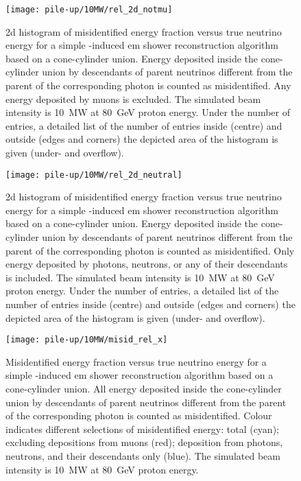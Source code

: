 \begin{figure}[htb]
	\centering
	\texttt{[image: pile-up/10MW/rel\_2d\_notmu]}
	\caption{\gls{2d} histogram of misidentified energy fraction versus true neutrino energy for a simple \Pgpz-induced \gls{em} shower reconstruction algorithm based on a cone-cylinder union.
		Energy deposited inside the cone-cylinder union by descendants of parent neutrinos different from the parent of the corresponding \Pgpz photon is counted as misidentified.
		Any energy deposited by muons is excluded.
		The simulated beam intensity is \SI{10}{\mega\watt} at \SI{80}{\giga\electronvolt} proton energy.
		Under the number of entries, a detailed list of the number of entries inside (centre) and outside (edges and corners) the depicted area of the histogram is given (under- and overflow).}
\end{figure}

\begin{figure}[htb]
	\centering
	\texttt{[image: pile-up/10MW/rel\_2d\_neutral]}
	\caption{\gls{2d} histogram of misidentified energy fraction versus true neutrino energy for a simple \Pgpz-induced \gls{em} shower reconstruction algorithm based on a cone-cylinder union.
		Energy deposited inside the cone-cylinder union by descendants of parent neutrinos different from the parent of the corresponding \Pgpz photon is counted as misidentified.
		Only energy deposited by photons, neutrons, or any of their descendants is included.
		The simulated beam intensity is \SI{10}{\mega\watt} at \SI{80}{\giga\electronvolt} proton energy.
		Under the number of entries, a detailed list of the number of entries inside (centre) and outside (edges and corners) the depicted area of the histogram is given (under- and overflow).}
\end{figure}

\begin{figure}[htb]
	\centering
	\texttt{[image: pile-up/10MW/misid\_rel\_x]}
	\caption{Misidentified energy fraction versus true neutrino energy for a simple \Pgpz-induced \gls{em} shower reconstruction algorithm based on a cone-cylinder union.
		All energy deposited inside the cone-cylinder union by descendants of parent neutrinos different from the parent of the corresponding \Pgpz photon is counted as misidentified.
		Colour indicates different selections of misidentified energy: total (cyan); excluding depositions from muons (red); deposition from photons, neutrons, and their descendants only (blue).
		The simulated beam intensity is \SI{10}{\mega\watt} at \SI{80}{\giga\electronvolt} proton energy.}
\end{figure}

